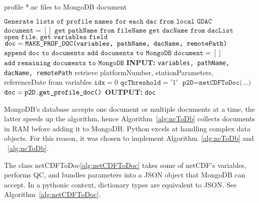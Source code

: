 \begin{algorithm}
\caption{profile *.nc files to MongoDB document}\label{alg:ncToDb}
\begin{algorithmic}[1]
\State $\texttt{Generate lists of profile names for each dac from local GDAC}$
\State $\texttt{document} = []$
\State $\texttt{get pathName from fileName}$
\State $\texttt{get dacName from dacList}$
\State $\texttt{open file, get variables field}$
\State $\texttt{doc} = \texttt{MAKE\textunderscore PROF\textunderscore DOC(variables, pathName, dacName, remotePath)}$
\State $\texttt{append doc to documents}$
\State $\texttt{add documents to MongoDB}$
\State $\texttt{document} = []$
\EndIf
\EndLoop
\State $\texttt{add remaining documents to MongoDB}$
\EndLoop
\EndProcedure
{}
\State \textbf{INPUT:} \texttt{variables, pathName, dacName, remotePath}
\State retrieve platformNumber, stationParameters, referenceDate from variables
\State $\texttt{idx}=0$
\State $\texttt{qcThreshold}='1'$
\State $\texttt{p2D} = \texttt{netCDFToDoc(...)}$
\State $\texttt{doc} = \texttt{p2D.get\textunderscore profile\textunderscore doc()}$
\State \textbf{OUTPUT:} \texttt{doc}
\EndProcedure
\end{algorithmic}
\end{algorithm}

MongoDB's database accepts one document or multiple documents at a time, the latter speeds up the algorithm, hence Algorithm~\ref{alg:ncToDb} collects documents in RAM before adding it to MongoDB. Python excels at handling complex data objects. For this reason, it was chosen to implement Algorithm~\ref{alg:ncToDb} and ~\ref{alg:ncToDb}.

The class netCDFToDoc\ref{alg:netCDFToDoc} takes some of netCDF's variables, performs QC, and bundles parameters into a JSON object that MongoDB can accept. In a pythonic context, dictionary types are equivalent to JSON. See Algorithm~\ref{alg:netCDFToDoc}.

